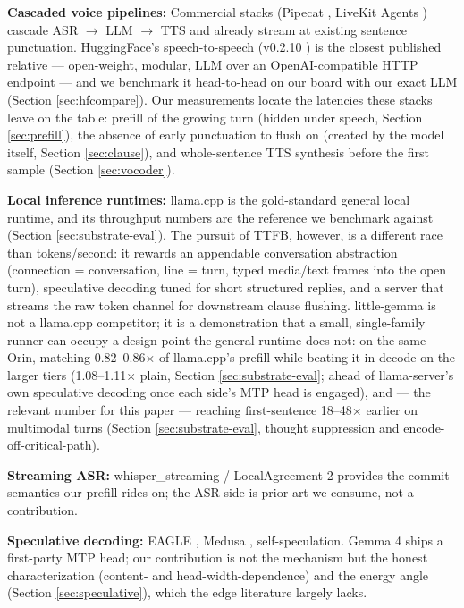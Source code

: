 \documentclass{article}
\begin{document}
\textbf{Cascaded voice pipelines:} Commercial stacks (Pipecat \citep{pipecat}, LiveKit Agents \citep{livekitagents}) cascade ASR $\rightarrow$ LLM $\rightarrow$ TTS and already stream at existing sentence punctuation. HuggingFace's speech-to-speech (v0.2.10 \citep{hfspeech2speech}) is the closest published relative --- open-weight, modular, LLM over an OpenAI-compatible HTTP endpoint --- and we benchmark it head-to-head on our board with our exact LLM (Section \ref{sec:hfcompare}). Our measurements locate the latencies these stacks leave on the table: prefill of the growing turn (hidden under speech, Section \ref{sec:prefill}), the absence of early punctuation to flush on (created by the model itself, Section \ref{sec:clause}), and whole-sentence TTS synthesis before the first sample (Section \ref{sec:vocoder}).

\textbf{Local inference runtimes:} llama.cpp \citep{llamacpp} is the gold-standard general local runtime, and its throughput numbers are the reference we benchmark against (Section \ref{sec:substrate-eval}). The pursuit of TTFB, however, is a different race than tokens/second: it rewards an appendable conversation abstraction (connection = conversation, line = turn, typed media/text frames into the open turn), speculative decoding tuned for short structured replies, and a server that streams the raw token channel for downstream clause flushing. little-gemma is not a llama.cpp competitor; it is a demonstration that a small, single-family runner can occupy a design point the general runtime does not: on the same Orin, matching 0.82--0.86× of llama.cpp's prefill while beating it in decode on the larger tiers (1.08--1.11× plain, Section \ref{sec:substrate-eval}; ahead of llama-server's own speculative decoding once each side's MTP head is engaged), and --- the relevant number for this paper --- reaching first-sentence 18--48× earlier on multimodal turns (Section \ref{sec:substrate-eval}, thought suppression and encode-off-critical-path).

\textbf{Streaming ASR:} whisper\_streaming / LocalAgreement-2 \citep{machacek2023whisper} provides the commit semantics our prefill rides on; the ASR side is prior art we consume, not a contribution.

\textbf{Speculative decoding:} EAGLE \citep{li2024eagle}, Medusa \citep{cai2024medusa}, self-speculation. Gemma 4 ships a first-party MTP head; our contribution is not the mechanism but the honest characterization (content- and head-width-dependence) and the energy angle (Section \ref{sec:speculative}), which the edge literature largely lacks.
\end{document}
